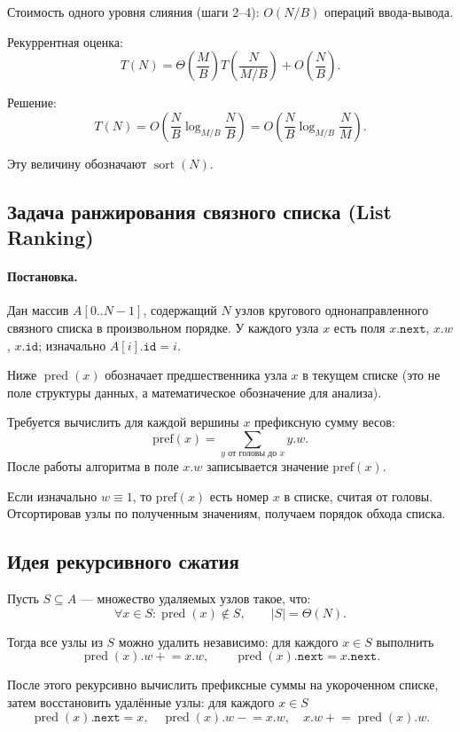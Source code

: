 Стоимость одного уровня слияния (шаги 2--4): $O(N/B)$ операций ввода-вывода.

Рекуррентная оценка:
\[
T(N) = \Theta\!\left(\frac{M}{B}\right) T\!\left(\frac{N}{M/B}\right) + O\!\left(\frac{N}{B}\right).
\]

Решение:
\[
T(N) = O\!\left(\frac{N}{B} \log_{M/B} \frac{N}{B}\right) = O\!\left(\frac{N}{B} \log_{M/B} \frac{N}{M}\right).
\]

Эту величину обозначают $\operatorname{sort}(N)$.

\subsection{Задача ранжирования связного списка (List Ranking)}

\paragraph{Постановка.}
Дан массив $A[0..N-1]$, содержащий $N$ узлов кругового однонаправленного связного списка в произвольном порядке. У каждого узла $x$ есть поля $x.\texttt{next}$, $x.w$, $x.\texttt{id}$; изначально $A[i].\texttt{id} = i$.

Ниже $\operatorname{pred}(x)$ обозначает предшественника узла $x$ в текущем списке (это не поле структуры данных, а математическое обозначение для анализа).

Требуется вычислить для каждой вершины $x$ префиксную сумму весов:
\[
\mathrm{pref}(x) = \sum_{y \text{ от головы до } x} y.w.
\]
После работы алгоритма в поле $x.w$ записывается значение $\mathrm{pref}(x)$.

Если изначально $w \equiv 1$, то $\mathrm{pref}(x)$ есть номер $x$ в списке, считая от головы. Отсортировав узлы по полученным значениям, получаем порядок обхода списка.

\subsection{Идея рекурсивного сжатия}

Пусть $S \subseteq A$ --- множество удаляемых узлов такое, что:
\[
\forall x \in S \colon \operatorname{pred}(x) \notin S, \qquad |S| = \Theta(N).
\]

Тогда все узлы из $S$ можно удалить независимо: для каждого $x \in S$ выполнить
\[
\operatorname{pred}(x).w \mathrel{+}= x.w, \qquad \operatorname{pred}(x).\texttt{next} = x.\texttt{next}.
\]

После этого рекурсивно вычислить префиксные суммы на укороченном списке, затем восстановить удалённые узлы: для каждого $x \in S$
\[
\operatorname{pred}(x).\texttt{next} = x, \quad
\operatorname{pred}(x).w \mathrel{-}= x.w, \quad
x.w \mathrel{+}= \operatorname{pred}(x).w.
\]

